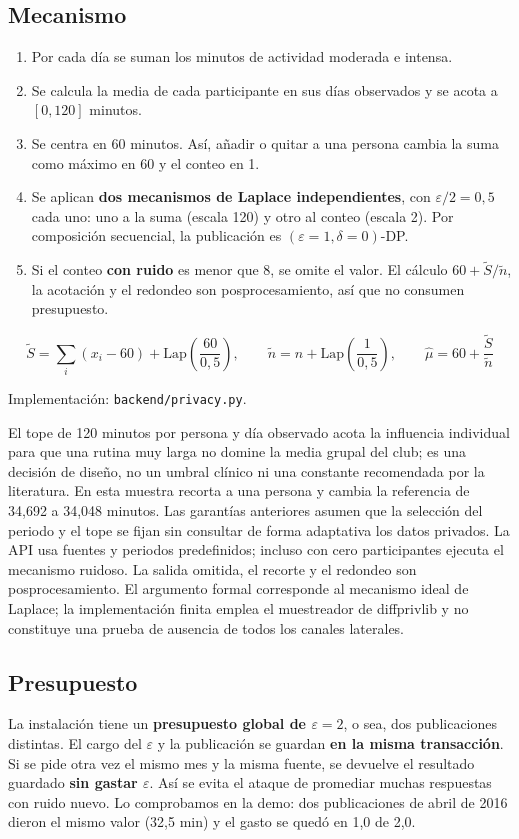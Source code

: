 \documentclass[11pt]{article}
\begin{document}
\subsection{Mecanismo}
\begin{enumerate}[nosep]
  \item Por cada día se suman los minutos de actividad moderada e intensa.
  \item Se calcula la media de cada participante en sus días observados y se acota a $[0, 120]$ minutos.
  \item Se centra en 60 minutos. Así, añadir o quitar a una persona cambia la suma como máximo en 60 y el conteo en 1.
  \item Se aplican \textbf{dos mecanismos de Laplace independientes}, con $\varepsilon/2 = 0{,}5$ cada uno: uno a la suma (escala 120) y otro al conteo (escala 2). Por composición secuencial, la publicación es $(\varepsilon = 1, \delta = 0)$-DP.
  \item Si el conteo \textbf{con ruido} es menor que 8, se omite el valor. El cálculo $60 + \tilde{S}/\tilde{n}$, la acotación y el redondeo son posprocesamiento, así que no consumen presupuesto.
\end{enumerate}

\[
\tilde{S} = \sum_i (x_i - 60) + \mathrm{Lap}\!\left(\frac{60}{0{,}5}\right), \qquad
\tilde{n} = n + \mathrm{Lap}\!\left(\frac{1}{0{,}5}\right), \qquad
\hat{\mu} = 60 + \frac{\tilde{S}}{\tilde{n}}
\]

Implementación: \texttt{backend/privacy.py}.

El tope de 120 minutos por persona y día observado acota la influencia individual para que una rutina muy larga no domine la media grupal del club; es una decisión de diseño, no un umbral clínico ni una constante recomendada por la literatura. En esta muestra recorta a una persona y cambia la referencia de 34,692 a 34,048 minutos. Las garantías anteriores asumen que la selección del periodo y el tope se fijan sin consultar de forma adaptativa los datos privados. La API usa fuentes y periodos predefinidos; incluso con cero participantes ejecuta el mecanismo ruidoso. La salida omitida, el recorte y el redondeo son posprocesamiento. El argumento formal corresponde al mecanismo ideal de Laplace; la implementación finita emplea el muestreador de diffprivlib y no constituye una prueba de ausencia de todos los canales laterales.

\subsection{Presupuesto}
La instalación tiene un \textbf{presupuesto global de $\varepsilon = 2$}, o sea, dos publicaciones distintas. El cargo del $\varepsilon$ y la publicación se guardan \textbf{en la misma transacción}. Si se pide otra vez el mismo mes y la misma fuente, se devuelve el resultado guardado \textbf{sin gastar $\varepsilon$}. Así se evita el ataque de promediar muchas respuestas con ruido nuevo. Lo comprobamos en la demo: dos publicaciones de abril de 2016 dieron el mismo valor (32,5 min) y el gasto se quedó en 1,0 de 2,0.
\end{document}

